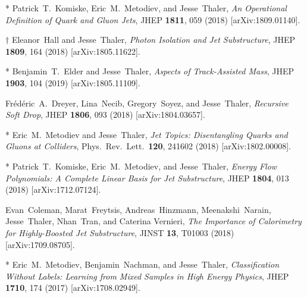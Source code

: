 \documentclass[11pt]{article}
\renewcommand{\bibitem}[1]{\item}
\begin{document}
\begin{list}{[]\addtocounter{jessecount}{-1}}{\leftmargin=3em \itemsep=4pt}
\bibitem{Komiske:2018vkc} 
  * Patrick~T.~Komiske, Eric~M.~Metodiev, and Jesse~Thaler,
  \emph{An Operational Definition of Quark and Gluon Jets},
  JHEP {\bf 1811}, 059 (2018)
  [arXiv:1809.01140].

\bibitem{Hall:2018jub} 
  $\dagger$ Eleanor~Hall and Jesse~Thaler,
  \emph{Photon Isolation and Jet Substructure},
  JHEP {\bf 1809}, 164 (2018)
  [arXiv:1805.11622].

\bibitem{Elder:2018mcr} 
  * Benjamin~T.~Elder and Jesse~Thaler,
  \emph{Aspects of Track-Assisted Mass},
  JHEP {\bf 1903}, 104 (2019)
  [arXiv:1805.11109].

\bibitem{Dreyer:2018tjj} 
  Fr\'ed\'eric~A.~Dreyer, Lina~Necib, Gregory~Soyez, and Jesse~Thaler,
  \emph{Recursive Soft Drop},
  JHEP {\bf 1806}, 093 (2018)
  [arXiv:1804.03657].

\bibitem{Metodiev:2018ftz} 
  * Eric~M.~Metodiev and Jesse~Thaler,
  \emph{Jet Topics: Disentangling Quarks and Gluons at Colliders},
  Phys.\ Rev.\ Lett.\  {\bf 120}, 241602 (2018)
  [arXiv:1802.00008].

\bibitem{Komiske:2017aww} 
  * Patrick~T.~Komiske, Eric~M.~Metodiev, and Jesse~Thaler,
  \emph{Energy Flow Polynomials: A Complete Linear Basis for Jet Substructure},
  JHEP {\bf 1804}, 013 (2018)
  [arXiv:1712.07124].

\bibitem{Coleman:2017fiq} 
  Evan~Coleman, Marat~Freytsis, Andreas~Hinzmann, Meenakshi~Narain, Jesse~Thaler, Nhan~Tran, and Caterina Vernieri,
  \emph{The Importance of Calorimetry for Highly-Boosted Jet Substructure},
  JINST {\bf 13}, T01003 (2018)
  [arXiv:1709.08705].

\bibitem{Metodiev:2017vrx} 
  * Eric~M.~Metodiev, Benjamin~Nachman, and Jesse~Thaler,
  \emph{Classification Without Labels: Learning from Mixed Samples in High Energy Physics},
  JHEP {\bf 1710}, 174 (2017)
  [arXiv:1708.02949].



\end{list}
\end{document}
